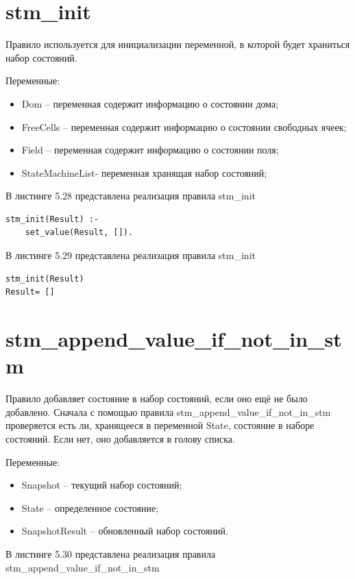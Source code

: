 \documentclass[12pt]{report}
\begin{document}
\section{stm\_init}
Правило используется для инициализации переменной, в которой будет храниться набор состояний.

Переменные:
\begin{itemize}
\item Dom – переменная содержит информацию о состоянии дома;
\item FreeCells – переменная содержит информацию о состоянии свободных ячеек;
\item Field – переменная содержит информацию о состоянии поля;
\item StateMachineList- переменная хранящая набор состояний;
\end{itemize}

В листинге 5.28 представлена реализация правила stm\_init

\begin{lstlisting}[label=some-code, caption=реализация правила stm\_init]
stm_init(Result) :-
	set_value(Result, []).
\end{lstlisting}
В листинге 5.29 представлена реализация правила stm\_init

\begin{lstlisting}[label=some-code, caption=реализация правила stm\_init]
stm_init(Result)
Result= []
\end{lstlisting}
\section{stm\_append\_value\_if\_not\_in\_stm}
Правило добавляет состояние в набор состояний, если оно ещё не было добавлено. Сначала с помощью правила stm\_append\_value\_if\_not\_in\_stm проверяется есть ли, хранящееся в переменной State, состояние в наборе состояний. Если нет, оно добавляется в голову списка.

Переменные:
\begin{itemize}
\item Snapshot – текущий набор состояний;
\item State – определенное состояние;
\item SnapshotResult – обновленный набор состояний.
\end{itemize}

В листинге 5.30 представлена реализация правила
\newline
stm\_append\_value\_if\_not\_in\_stm
\end{document}
